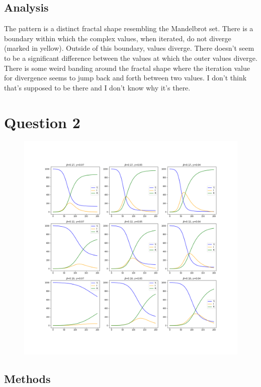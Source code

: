 \documentclass{article}
\begin{document}
\subsection*{Analysis}

The pattern is a distinct fractal shape resembling the Mandelbrot set. There is a boundary within which the complex values, when iterated, do not diverge (marked in yellow). Outside of this boundary, values diverge. There doesn't seem to be a significant difference between the values at which the outer values diverge. There is some weird banding around the fractal shape where the iteration value for divergence seems to jump back and forth between two values. I don't think that's supposed to be there and I don't know why it's there. 

\newpage 

\section*{Question 2}

\begin{figure}[!htbp]
	\centering
	\includegraphics[width=1.2\linewidth]{q2.png}
\end{figure}

\subsection*{Methods}
\end{document}
